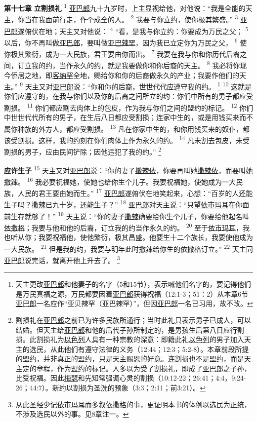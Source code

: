 \textbf{第十七章 }
\textbf{立割损礼 }
\textsuperscript{1}
\uline{亚巴郎}九十九岁时，上主显视给他，对他说：“我是全能的天主，你当在我面前行走，作个成全的人。
\textsuperscript{2}
我要与你立约，使你极其繁盛。”
\textsuperscript{3}
\uline{亚巴郎}遂俯伏在地；天主又对他说：
\textsuperscript{4}
“看，是我与你立约：你要成为万民之父；
\textsuperscript{5}
以后，你不再叫做\uline{亚巴郎}，要叫做\uline{亚巴辣罕}，因为我已立定你为万民之父，
\textsuperscript{6}
使你极其繁衍，成为一大民族，君王要由你而出。
\textsuperscript{7}
我要在我与你和你历代后裔之间，订立我的约，当作永久的约，就是我要做你和你后裔的天主。
\textsuperscript{8}
我必将你现今侨居之地，即\uline{客纳罕}全地，赐给你和你的后裔做永久的产业；我要作他们的天主。”
\textsuperscript{9}
天主又对\uline{亚巴郎}说：“你和你的后裔，世世代代应遵守我的约。
\footnote{天主更改\uline{亚巴郎}和他妻子的名字（5和15节），表示喊他们名字的，要记得他们是万民真福之源，万民都要因着\uline{亚巴郎}获得祝福（12:1-3；51：2）从本章6节\uline{亚巴郎}一名应作“亚贝辣罕（亚巴辣罕）”，但因\uline{亚巴郎}一名已习用，故不改。}
\textsuperscript{10}
这就是你们应遵守的，在我与你们以及你的后裔之间所立的约：你们中所有的男子都应受割损。
\textsuperscript{11}
你们都应割去肉体上的包皮，作为我与你们之间的盟约的标记。
\textsuperscript{12}
你们中世世代代所有的男子，在生后八日都应受割损；连家中生的，或是用钱买来而不属你种族的外方人，都应受割损。
\textsuperscript{13}
凡在你家中生的，和你用钱买来的奴仆，都该受割损。这样，我的约刻在你们肉体上作为永久的约。
\textsuperscript{14}
凡未割去包皮，未受割损的男子，应由民间铲除；因他违犯了我的约。”
\footnote{割损礼在\uline{亚巴郎}之前已为许多民族所通行；当时此礼只表示男子已成人，可以结婚。但天主给\uline{亚巴郎}和他的后代子孙所制定的，是男孩生后第八日应行割损。此割损礼为\uline{以色列}人具有一种宗教的深意：即籍此礼\uline{以色列}的男子加入天主的选民，从此他们有遵守法律的义务（12:44；12:3；5:2-8）。本章前段所提的盟约，并非真正的盟约，只是天主赐恩的好意。连割损也不是盟约，而是天主定的章程，作为盟约的标记。人多以为受了割损礼，即成了\uline{亚巴郎}之子孙，比受祝福。因此\uline{梅瑟}和先知常强调心灵的割损（10:12-22；26:41；4:4，9:24-26；44:7）。新约以割损为圣洗的预象（3:3；2:11；前3:21）。}

\textbf{应许生子 }
\textsuperscript{15}
天主又对\uline{亚巴郎}说：“你的妻子\uline{撒辣依}，你要再叫她\uline{撒辣依}，而要叫她\uline{撒辣}。
\textsuperscript{16}
我必要祝福她，使她也给你生个儿子。我要祝福她，使她成为一大民族，人民的君王要由她而生。”
\textsuperscript{17}
\uline{亚巴郎}遂俯伏在地笑起来，心想：“百岁的人还能生子吗？\uline{撒辣}已九十岁，还能生子？”
\textsuperscript{18}
\uline{亚巴郎}对天主说：“只望\uline{依市玛耳}在你面前生存就够了！”
\textsuperscript{19}
天主说：“你的妻子\uline{撒辣}确要给你生个儿子，你要给他起名叫\uline{依撒格}；我要与他和他的后裔，订立我的约当作永久的约。
\textsuperscript{20}
至于\uline{依市玛耳}，我也听从你；我要祝福他，使他繁衍，极其昌盛。他要生十二个族长，我要使他成为一大民族。
\textsuperscript{21}
但是我的约，我要与明年此时\uline{撒辣}给你生的\uline{依撒格}订立。”
\textsuperscript{22}
天主同\uline{亚巴郎}说完话，就离开他上升去了。
\footnote{从此圣经少记\uline{依市玛耳}而多叙\uline{依撒格}的事，更证明本书的体例以选民为正统，不涉及选民以外的事。见8章注一。}

